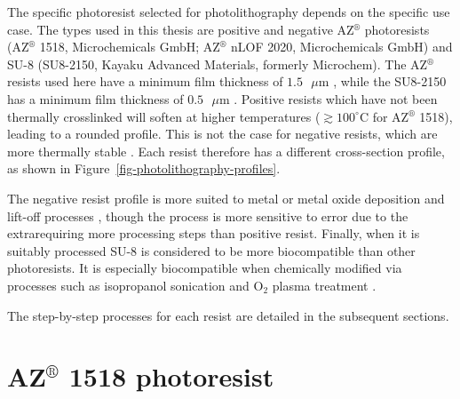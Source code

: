 \documentclass[
  a4paper,
]{scrbook}
\begin{document}
The specific photoresist selected for photolithography depends on the
specific use case. The types used in this thesis are positive and
negative AZ\(^\circledR\) photoresists (AZ\(^\circledR\) 1518,
Microchemicals GmbH; AZ\(^\circledR\) nLOF 2020, Microchemicals GmbH)
and SU-8 (SU8-2150, Kayaku Advanced Materials, formerly Microchem). The
AZ\(^\circledR\) resists used here have a minimum film thickness of
\(1.5\textrm{ } \mu \textrm{m}\) \autocite{Microchemicals}, while the
SU8-2150 has a minimum film thickness of
\(0.5\textrm{ } \mu \textrm{m}\) \autocite{Kayaku}. Positive resists
which have not been thermally crosslinked will soften at higher
temperatures (\(\gtrsim 100^\circ\)C for AZ\(^\circledR\) 1518), leading
to a rounded profile. This is not the case for negative resists, which
are more thermally stable \autocite{Microchemicals}. Each resist
therefore has a different cross-section profile, as shown in
Figure~\ref{fig-photolithography-profiles}.

The negative resist profile is more suited to metal or metal oxide
deposition and lift-off processes \autocite{Microchemicals}, though the
process is more sensitive to error due to the extrarequiring more
processing steps than positive resist. Finally, when it is suitably
processed SU-8 is considered to be more biocompatible than other
photoresists. It is especially biocompatible when chemically modified
via processes such as isopropanol sonication and O\(_2\) plasma
treatment \autocite{Chen2021}.

The step-by-step processes for each resist are detailed in the
subsequent sections.

\hypertarget{azcircledr-1518-photoresist}{%
\section{\texorpdfstring{AZ\(^\circledR\) 1518
photoresist}{AZ\^{}\textbackslash circledR 1518 photoresist}}\label{azcircledr-1518-photoresist}}
\end{document}
